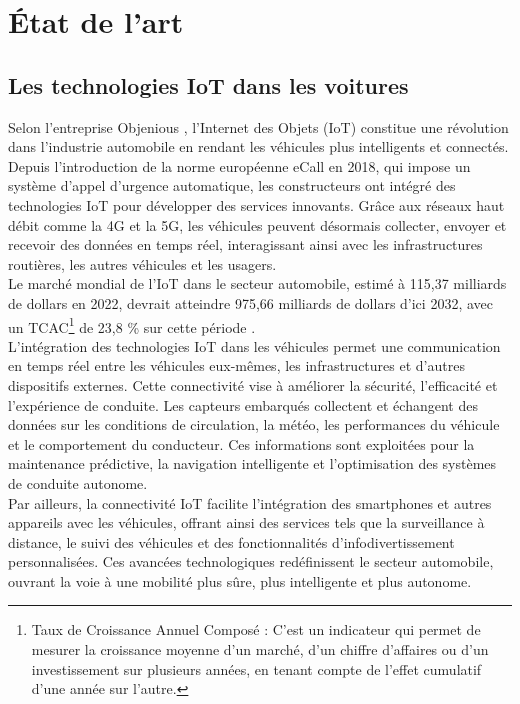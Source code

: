 \section{État de l'art}


\subsection{Les technologies IoT dans les voitures}

Selon l’entreprise Objenious \cite{noauthor_revolution_2025}, l’Internet des Objets (IoT) constitue une révolution dans l’industrie automobile en rendant les véhicules plus intelligents et connectés. Depuis l’introduction de la norme européenne eCall en 2018, qui impose un système d’appel d’urgence automatique, les constructeurs ont intégré des technologies IoT pour développer des services innovants. Grâce aux réseaux haut débit comme la 4G et la 5G, les véhicules peuvent désormais collecter, envoyer et recevoir des données en temps réel, interagissant ainsi avec les infrastructures routières, les autres véhicules et les usagers.\\
Le marché mondial de l’IoT dans le secteur automobile, estimé à 115,37 milliards de dollars en 2022, devrait atteindre 975,66 milliards de dollars d’ici 2032, avec un TCAC\footnote{Taux de Croissance Annuel Composé : C’est un indicateur qui permet de mesurer la croissance moyenne d’un marché, d’un chiffre d’affaires ou d’un investissement sur plusieurs années, en tenant compte de l’effet cumulatif d’une année sur l’autre.} de 23,8 \% sur cette période \cite{noauthor_taille_2023}.\\
L’intégration des technologies IoT dans les véhicules permet une communication en temps réel entre les véhicules eux-mêmes, les infrastructures et d’autres dispositifs externes. Cette connectivité vise à améliorer la sécurité, l’efficacité et l’expérience de conduite. Les capteurs embarqués collectent et échangent des données sur les conditions de circulation, la météo, les performances du véhicule et le comportement du conducteur. Ces informations sont exploitées pour la maintenance prédictive, la navigation intelligente et l’optimisation des systèmes de conduite autonome.\\
Par ailleurs, la connectivité IoT facilite l’intégration des smartphones et autres appareils avec les véhicules, offrant ainsi des services tels que la surveillance à distance, le suivi des véhicules et des fonctionnalités d’infodivertissement personnalisées. Ces avancées technologiques redéfinissent le secteur automobile, ouvrant la voie à une mobilité plus sûre, plus intelligente et plus autonome.


